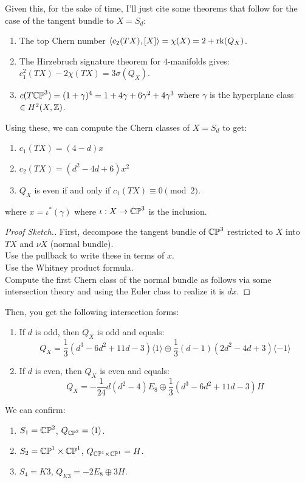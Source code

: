 \documentclass[12pt]{amsart}
\begin{document}
Given this, for the sake of time, I'll just cite some theorems that follow for the case of the tangent bundle to $X = S_d$: 
\begin{enumerate}
    \item The top Chern number $\langle c_2(TX), [X]\rangle = \chi(X) = 2 + \operatorname{rk}(Q_X)$. 
    \item The Hirzebruch signature theorem for $4$-manifolds gives: $c_1^2(TX) -2\chi(TX) = 3 \sigma(Q_X)$.
    \item $c(T\mathbb{CP}^3) = (1+\gamma)^4 = 1+4\gamma+6\gamma^2+4\gamma^3$ where $\gamma$ is the hyperplane class $\in H^2(X, \mathbb Z)$.
\end{enumerate} 

Using these, we can compute the Chern classes of $X = S_d$ to get: 
\begin{enumerate}
    \item $c_1(TX) = (4-d)x$
    \item $c_2(TX) = (d^2-4d+6)x^2$
    \item $Q_X$ is even if and only if $c_1(TX) \equiv 0 \pmod 2$. 
\end{enumerate}
where $x = \iota^*(\gamma)$ where $\iota: X \to \mathbb{CP}^3$ is the inclusion. 
\begin{proof}[Proof Sketch.]
    First, decompose the tangent bundle of $\mathbb{CP}^3$ restricted to $X$ into $TX$ and $\nu X$ (normal bundle).\\ 
    Use the pullback to write these in terms of $x$. \\ 
    Use the Whitney product formula. \\
    Compute the first Chern class of the normal bundle as follows via some intersection theory and using the Euler class to realize it is $dx$. 
\end{proof}

Then, you get the following intersection forms:
\begin{enumerate}
    \item If $d$ is odd, then $Q_X$ is odd and equals:
    \[ Q_X =  \frac{1}{3}(d^3-6d^2+11d-3)\langle 1 \rangle \oplus \frac{1}{3}(d-1)(2d^2-4d+3)\langle -1 \rangle\]
    \item If $d$ is even, then $Q_X$ is even and equals:
    \[ Q_X =  -\frac{1}{24} d(d^2-4) E_8 \oplus \frac{1}{3}(d^3-6d^2+11d-3)H\]
\end{enumerate}

We can confirm:
\begin{enumerate}
    \item $S_1 = \mathbb{CP}^2$, $Q_{\mathbb{CP}^2} = \langle 1 \rangle$. 
    \item $S_2 = \mathbb{CP}^1 \times \mathbb{CP}^1$, $Q_{\mathbb{CP}^1 \times \mathbb{CP}^1} = H$.
    \item $S_4 = K3$, $Q_{K3} = -2E_8 \oplus 3H$. 
\end{enumerate}
\end{document}
